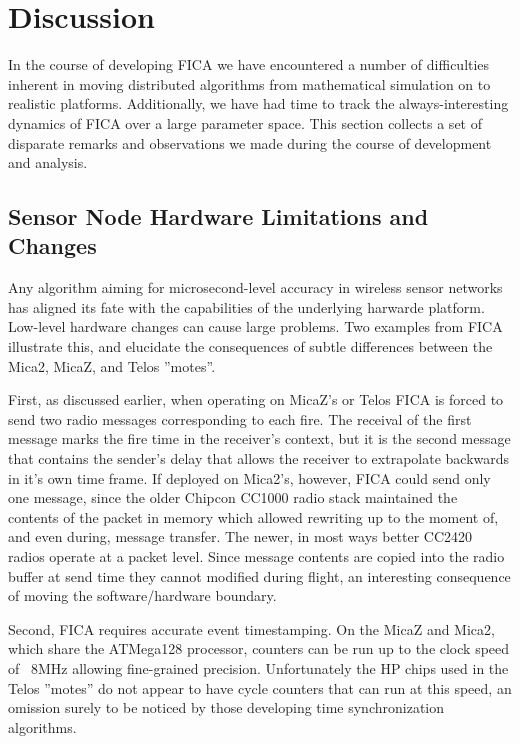\section{Discussion}
\label{sec:discussion}

In the course of developing FICA we have encountered a number of difficulties
inherent in moving distributed algorithms from mathematical simulation on to
realistic platforms.  Additionally, we have had time to track the
always-interesting dynamics of FICA over a large parameter space.  This
section collects a set of disparate remarks and observations we made during
the course of development and analysis.

\subsection{Sensor Node Hardware Limitations and Changes}

Any algorithm aiming for microsecond-level accuracy in wireless sensor
networks has aligned its fate with the capabilities of the underlying
harwarde platform.  Low-level hardware changes can cause large problems.
Two examples from FICA illustrate this, and elucidate the consequences of
subtle differences between the Mica2, MicaZ, and Telos ''motes''.

First, as discussed earlier, when operating on MicaZ's or Telos FICA is
forced to send two radio messages corresponding to each fire.  The receival
of the first message marks the fire time in the receiver's context, but it is
the second message that contains the sender's delay that allows the receiver
to extrapolate backwards in it's own time frame.  If deployed on Mica2's,
however, FICA could send only one message, since the older Chipcon CC1000
radio stack maintained the contents of the packet in memory which allowed
rewriting up to the moment of, and even during, message transfer.  The newer,
in most ways better CC2420 radios operate at a packet level.  Since message
contents are copied into the radio buffer at send time they cannot modified
during flight, an interesting consequence of moving the software/hardware
boundary.

Second, FICA requires accurate event timestamping.  On the MicaZ and Mica2,
which share the ATMega128 processor, counters can be run up to the clock
speed of ~8MHz allowing fine-grained precision.  Unfortunately the HP chips
used in the Telos ''motes'' do not appear to have cycle counters that can run
at this speed, an omission surely to be noticed by those developing time
synchronization algorithms.

